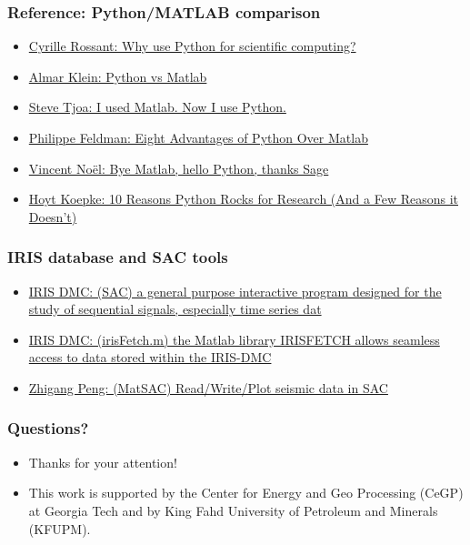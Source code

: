 \documentclass[compress]{beamer}
\begin{document}
%	
%	

\begin{frame}
	\frametitle{Reference: Python/MATLAB comparison}
	\begin{itemize}
		\item \href{http://cyrille.rossant.net/why-using-python-for-scientific-computing/}{Cyrille Rossant: Why use Python for scientific computing?}
		\item \href{https://sites.google.com/site/pythonforscientists/python-vs-matlab}{Almar Klein: Python vs Matlab}
	    \item \href{https://stevetjoa.com/305/}{Steve Tjoa: I used Matlab. Now I use Python.}
    	\item \href{http://phillipmfeldman.org/Python/Advantages_of_Python_Over_Matlab.html}{Philippe Feldman: Eight Advantages of Python Over Matlab}
    	\item \href{https://vnoel.wordpress.com/2008/05/03/bye-matlab-hello-python-thanks-sage/}{Vincent Noël: Bye Matlab, hello Python, thanks Sage}
    	\item \href{http://www.stat.washington.edu/~hoytak/blog/whypython.html}{Hoyt Koepke: 10 Reasons Python Rocks for Research (And a Few Reasons it Doesn’t)}
	\end{itemize}
\end{frame}

\begin{frame}
	\frametitle{\hypertarget{ref:SAC}{IRIS database and SAC tools}}
	\begin{itemize}
		\item \href{https://ds.iris.edu/ds/nodes/dmc/software/downloads/sac/}{IRIS DMC: (SAC) a general purpose interactive program designed for the study of sequential signals, especially time series dat}
		\item \href{http://ds.iris.edu/ds/nodes/dmc/software/downloads/irisfetch.m/}{IRIS DMC: (irisFetch.m) the Matlab library IRISFETCH allows seamless access to data stored within the IRIS-DMC}
		\item \href{http://geophysics.eas.gatech.edu/people/zpeng/Teaching/SAC_Tutorial/\#part2_6}{Zhigang Peng: (MatSAC) Read/Write/Plot seismic data in SAC }
	\end{itemize}
\end{frame}

\begin{frame}
	\frametitle{Questions?}
	\begin{itemize}
		\Large \item Thanks for your attention!
		\vspace*{3cm}
		\tiny \item This work is supported by the Center for Energy and Geo
Processing (CeGP) at Georgia Tech and by King Fahd University
of Petroleum and Minerals (KFUPM).
	\end{itemize}
\end{frame}
\end{document}
